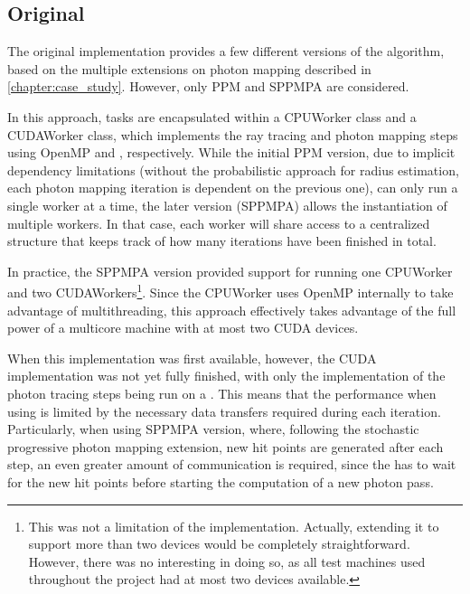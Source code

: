 \documentclass[main.tex]{subfiles}
\begin{document}
\subsection{Original} \label{section:impl_original}

The original implementation provides a few different versions of the algorithm, based on the multiple extensions on photon mapping described in \cref{chapter:case_study}. However, only PPM and SPPMPA are considered.

In this approach, tasks are encapsulated within a CPUWorker class and a CUDAWorker class, which implements the ray tracing and photon mapping steps using \acs{OpenMP} and \cuda, respectively. While the initial PPM version, due to implicit dependency limitations (without the probabilistic approach for radius estimation, each photon mapping iteration is dependent on the previous one), can only run a single worker at a time, the later version (SPPMPA) allows the instantiation of multiple workers. In that case, each worker will share access to a centralized structure that keeps track of how many iterations have been finished in total.

In practice, the SPPMPA version provided support for running one CPUWorker and two CUDAWorkers\footnote{This was not a limitation of the implementation. Actually, extending it to support more than two \cuda devices would be completely straightforward. However, there was no interesting in doing so, as all test machines used throughout the project had at most two \cuda devices available.}. Since the CPUWorker uses \acs{OpenMP} internally to take advantage of multithreading, this approach effectively takes advantage of the full power of a multicore machine with at most two \acs{CUDA} devices.

When this implementation was first available, however, the \acs{CUDA} implementation was not yet fully finished, with only the implementation of the photon tracing steps being run on a \gpu. This means that the performance when using \cuda is limited by the necessary data transfers required during each iteration. Particularly, when using SPPMPA version, where, following the stochastic progressive photon mapping extension, new hit points are generated after each step, an even greater amount of communication is required, since the \gpu has to wait for the new hit points before starting the computation of a new photon pass.


\end{document}
